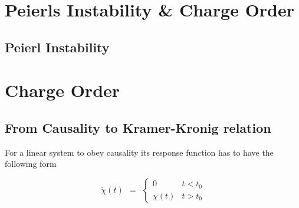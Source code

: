 \documentclass[10pt]{report}
\numberwithin{equation}{chapter}
\begin{document}
%


\chapter{Peierls Instability \& Charge Order}

\section{Peierl Instability}


%

\chapter{Charge Order}

\section{From Causality to Kramer-Kronig relation}


For a linear system to obey causality its response function has to have the following form

\begin{equation} \label{eq:response_causality}
  \tilde{\chi}(t) ~~ = ~~ \left\{ \begin{array}{lc} 
    0        &  t < t_0 \\
    \chi(t)  &  t > t_0
  \end{array}\right.
\end{equation}
\end{document}

